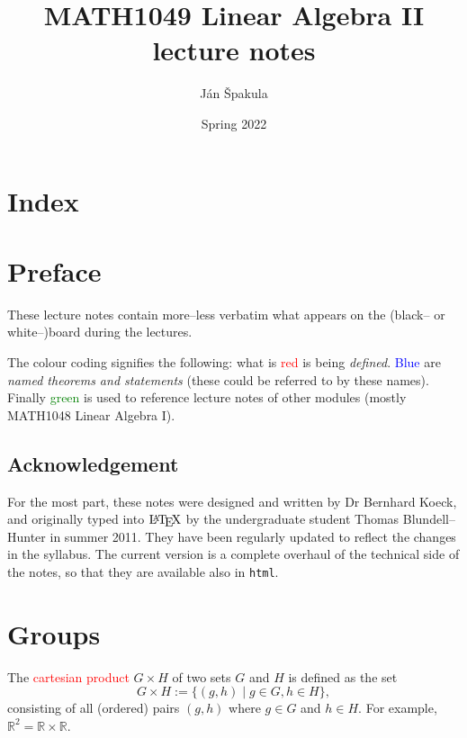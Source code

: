 \documentclass[
  12pt,
  a4paper,
  twoside]{article}
\title{MATH1049 Linear Algebra II lecture notes}
\author{Ján Špakula}
\date{Spring 2022}
\theoremstyle{plain}
\theoremstyle{definition}
\begin{document}
\maketitle

{
\setcounter{tocdepth}{2}
\tableofcontents
}
\hypertarget{index}{%
\section*{Index}\label{index}}

\hypertarget{preface}{%
\section*{Preface}\label{preface}}

These lecture notes contain more--less verbatim what appears on the (black-- or white--)board during the lectures.

The
colour coding
signifies the following: what is
\textcolor{red}{red}
is being \emph{defined}.
\textcolor{blue}{Blue}
are \emph{named theorems and statements} (these could be referred to by these names). Finally
\textcolor{green}{green}
is used to reference lecture notes of other modules (mostly MATH1048 Linear Algebra I).

\hypertarget{acknowledgement}{%
\subsection*{Acknowledgement}\label{acknowledgement}}

For the most part, these notes were designed and written by Dr Bernhard Koeck, and originally typed into \(\text{\LaTeX}\) by the undergraduate student Thomas Blundell--Hunter in summer 2011. They have been regularly updated to reflect the changes in the syllabus. The current version is a complete overhaul of the technical side of the notes, so that they are available also in \texttt{html}.

\newpage

\hypertarget{groups}{%
\section{Groups}\label{groups}}

The \textcolor{red}{cartesian product} \(G\times H\) of two sets \(G\) and \(H\) is defined as the set
\[ G\times H := \{(g,h) \mid g\in G, h\in H\}, \]
consisting of all (ordered) pairs \((g,h)\) where \(g\in G\) and \(h\in H\). For example, \(\mathbb{R}^2 = \mathbb{R}\times \mathbb{R}\).
\end{document}
